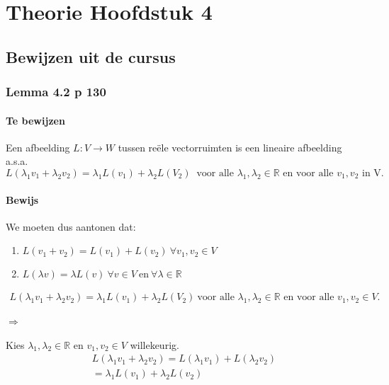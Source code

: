 \documentclass[lineaire_algebra_oplossingen.tex]{subfiles}
\begin{document}
\chapter{Theorie Hoofdstuk 4}

\section{Bewijzen uit de cursus}

\subsection{Lemma 4.2 p 130}
\label{4.2}

\subsubsection*{Te bewijzen}
Een afbeelding $L:V\rightarrow W$ tussen re\"ele vectorruimten is een lineaire afbeelding a.s.a.
$$L(\lambda_1v_1+\lambda_2v_2) = \lambda_1L(v_1)+\lambda_2L(V_2)\ \text{ voor alle } \lambda_1,\lambda_2 \in \mathbb{R} \text{ en voor alle } v_1,v_2 \text{ in V.}$$

\subsubsection*{Bewijs}
We moeten dus aantonen dat:
\begin{enumerate}
\item $L(v_1+v_2) = L(v_1) + L(v_2) \ \forall v_1,v_2 \in V$
\item $L(\lambda v) = \lambda L(v) \ \forall v \in V \ \text{en} \ \forall \lambda \in \mathbb{R}$
\end{enumerate}
\begin{align*}L(\lambda_1v_1+\lambda_2v_2) = \lambda_1L(v_1)+\lambda_2L(V_2)\ \text{voor alle $\lambda_1,\lambda_2 \in \mathbb{R}$ en voor alle $v_1,v_2 \in V$}. \tag{3.}
\end{align*}

\subsubsection*{$\Rightarrow$}
Kies $\lambda_1,\lambda_2 \in \mathbb{R}$ en $v_1,v_2 \in V$ willekeurig.
\begin{align*}
L(\lambda_1 v_1 + \lambda_2 v_2) = L(\lambda_1 v_1) + L(\lambda_2 v_2)\tag{wegens 1.}\\
=\lambda_1 L(v_1)+ \lambda_2 L(v_2) \tag{wegens 2.}
\end{align*}
\end{document}
